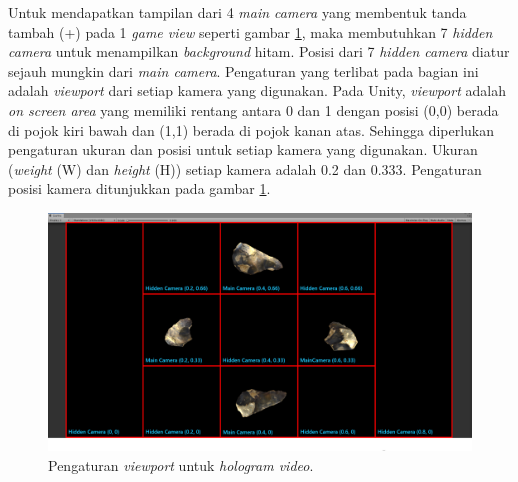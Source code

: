 		Untuk mendapatkan tampilan dari 4 \textit{main camera} yang membentuk tanda tambah (+) pada 1 \textit{game view} seperti gambar \ref{fig:unity_12cam}, maka membutuhkan 7 \textit{hidden camera} untuk menampilkan \textit{background} hitam. Posisi dari 7 \textit{hidden camera} diatur sejauh mungkin dari \textit{main camera}. Pengaturan yang terlibat pada bagian ini adalah \textit{viewport} dari setiap kamera yang digunakan. Pada Unity, \textit{viewport} adalah \textit{on screen area} yang memiliki rentang antara 0 dan 1 dengan posisi (0,0) berada di pojok kiri bawah dan (1,1) berada di pojok kanan atas. Sehingga diperlukan pengaturan ukuran dan posisi untuk setiap kamera yang digunakan. Ukuran (\textit{weight} (W) dan \textit{height} (H)) setiap kamera adalah 0.2 dan 0.333. Pengaturan posisi kamera ditunjukkan pada gambar \ref{fig:unity_12cam}. 
		\begin{figure} [H]
			\includegraphics[width=\textwidth]{img/bab3/unity_12cam.png}
			\caption{Pengaturan \textit{viewport} untuk \textit{hologram video}.}
			\label{fig:unity_12cam}
		\end{figure}
	\vspace{1.5ex}
	
